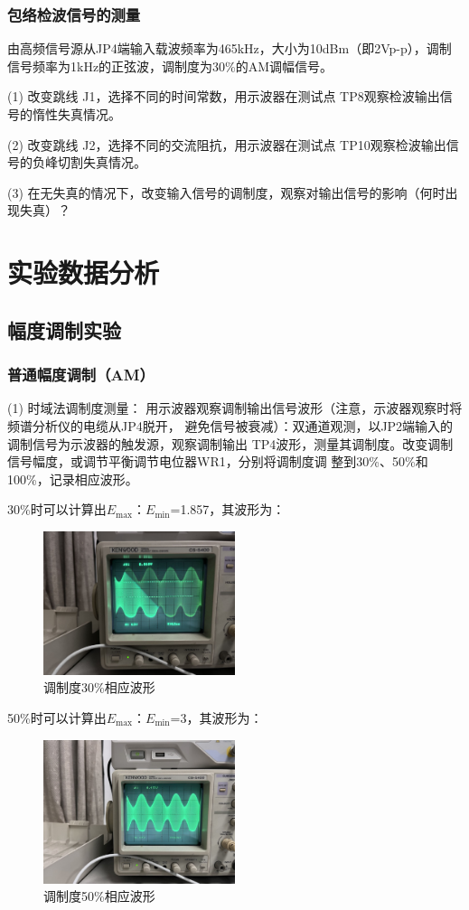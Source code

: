 \documentclass{../source/Experiment}
\begin{document}
\subsubsection{包络检波信号的测量}

由高频信号源从JP4端输入载波频率为465kHz，大小为10dBm（即2Vp-p），调制信号频率为1kHz的正弦波，调制度为30\%的AM调幅信号。

(1) 改变跳线 J1，选择不同的时间常数，用示波器在测试点 TP8观察检波输出信号的惰性失真情况。

(2) 改变跳线 J2，选择不同的交流阻抗，用示波器在测试点 TP10观察检波输出信号的负峰切割失真情况。

(3) 在无失真的情况下，改变输入信号的调制度，观察对输出信号的影响（何时出现失真）？
\section{实验数据分析}
\subsection{幅度调制实验}

\subsubsection{普通幅度调制（AM）}
(1) 时域法调制度测量：
用示波器观察调制输出信号波形（注意，示波器观察时将频谱分析仪的电缆从JP4脱开，
避免信号被衰减）：双通道观测，以JP2端输入的调制信号为示波器的触发源，观察调制输出
TP4波形，测量其调制度。改变调制信号幅度，或调节平衡调节电位器WR1，分别将调制度调
整到30\%、50\%和100\%，记录相应波形。

30\%时可以计算出$E_{\max }：E_{\min }$=1.857，其波形为：
\begin{figure}[H]
    \centering
    \includegraphics[width = 0.5\textwidth]{lab6/6.png}
    \caption{调制度30\%相应波形}
\end{figure}

50\%时可以计算出$E_{\max }：E_{\min }$=3，其波形为：
\begin{figure}[H]
    \centering
    \includegraphics[width = 0.5\textwidth]{lab6/7.png}
    \caption{调制度50\%相应波形}
\end{figure}
\end{document}
